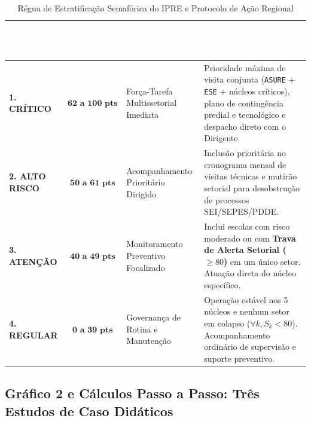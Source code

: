 \documentclass[9pt,a4paper]{extarticle}
\begin{document}
\begin{table}[htbp]
\centering
\footnotesize
\renewcommand{\arraystretch}{1.25}
\caption{Régua de Estratificação Semafórica do IPRE e Protocolo de Ação Regional}
\begin{tabularx}{\textwidth}{>{\bfseries}p{2.8cm} c p{3.6cm} X}
\toprule
\rowcolor{ureNavy} \textcolor{white}{Faixa Semafórica} & \textcolor{white}{\textbf{Intervalo IPRE}} & \textcolor{white}{\textbf{Nível de Intervenção}} & \textcolor{white}{\textbf{Protocolo Prescritivo para os Núcleos da URE Itapevi}} \\
\midrule
\rowcolor{riskCritBg} \textcolor{riskCrit}{1. CRÍTICO} & $\mathbf{62\text{ a }100\text{ pts}}$ & Força-Tarefa Multissetorial Imediata & Prioridade máxima de visita conjunta (\texttt{ASURE} + \texttt{ESE} + núcleos críticos), plano de contingência predial e tecnológico e despacho direto com o Dirigente. \\
\rowcolor{riskHighBg} \textcolor{riskHigh}{2. ALTO RISCO} & $\mathbf{50\text{ a }61\text{ pts}}$ & Acompanhamento Prioritário Dirigido & Inclusão prioritária no cronograma mensal de visitas técnicas e mutirão setorial para desobstrução de processos SEI/SEPES/PDDE. \\
\rowcolor{riskWarnBg} \textcolor{riskWarn}{3. ATENÇÃO} & $\mathbf{40\text{ a }49\text{ pts}}$ & Monitoramento Preventivo Focalizado & Inclui escolas com risco moderado ou com \textbf{Trava de Alerta Setorial ($\ge 80$)} em um único setor. Atuação direta do núcleo específico. \\
\rowcolor{riskOkBg} \textcolor{riskOk}{4. REGULAR} & $\mathbf{0\text{ a }39\text{ pts}}$ & Governança de Rotina e Manutenção & Operação estável nos 5 núcleos e nenhum setor em colapso ($\forall k, S_k < 80$). Acompanhamento ordinário de supervisão e suporte preventivo. \\
\bottomrule
\end{tabularx}
\end{table}

\subsection{Gráfico 2 e Cálculos Passo a Passo: Três Estudos de Caso Didáticos}
\end{document}

